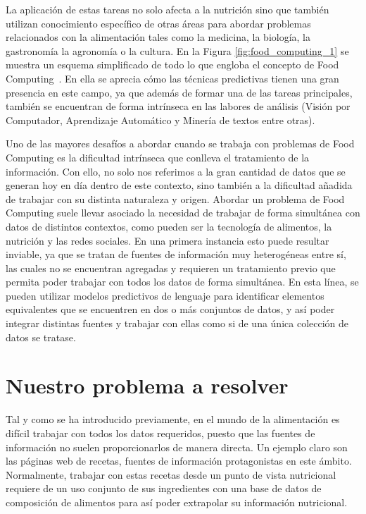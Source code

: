 La aplicación de estas tareas no solo afecta a la nutrición sino que también utilizan conocimiento específico de otras áreas para abordar problemas relacionados con la alimentación tales como la medicina, la biología, la gastronomía la agronomía o la cultura. En la Figura \ref{fig:food_computing_1} se muestra un esquema simplificado de todo lo que engloba el concepto de Food Computing~\cite{min2019survey}. 
En ella se aprecia cómo las técnicas predictivas tienen una gran presencia en este campo, ya que además de formar una de las tareas principales, también se encuentran de forma intrínseca en las labores de análisis (Visión por Computador, Aprendizaje Automático y Minería de textos entre otras).

Uno de las mayores desafíos a abordar cuando se trabaja con problemas de Food Computing es la dificultad intrínseca que conlleva el tratamiento de la información. Con ello, no solo nos referimos a la gran cantidad de datos que se generan hoy en día dentro de este contexto, sino también a la dificultad añadida de trabajar con su distinta naturaleza y origen. Abordar un problema de Food Computing suele llevar asociado la necesidad de trabajar de forma simultánea con datos de distintos contextos, como pueden ser la tecnología de alimentos, la nutrición y las redes sociales. %
En una primera instancia esto puede resultar inviable, ya que se tratan de fuentes de información muy heterogéneas entre sí, las cuales no se encuentran agregadas y requieren un tratamiento previo que permita poder trabajar con todos los datos de forma simultánea. En esta línea, se pueden utilizar modelos predictivos de lenguaje para identificar elementos equivalentes que se encuentren en dos o más conjuntos de datos, y así poder integrar distintas fuentes y trabajar con ellas como si de una única colección de datos se tratase.

\section{Nuestro problema a resolver}

Tal y como se ha introducido previamente, en el mundo de la alimentación es difícil trabajar con todos los datos requeridos, puesto que las fuentes de información no suelen proporcionarlos de manera directa. Un ejemplo claro son las páginas web de recetas, fuentes de información protagonistas en este ámbito. Normalmente, trabajar con estas recetas desde un punto de vista nutricional requiere de un uso conjunto de sus ingredientes con una base de datos de composición de alimentos para así poder extrapolar su información nutricional. 

